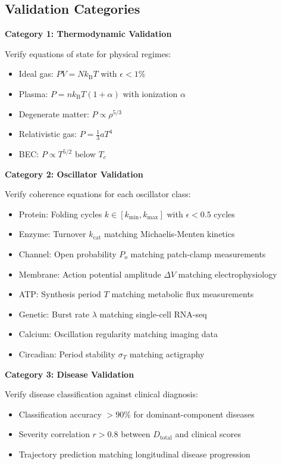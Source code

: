 \documentclass[10pt,twocolumn]{article}
\theoremstyle{plain}
\theoremstyle{definition}
\theoremstyle{remark}
\newcommand{\kB}{k_{\mathrm{B}}}
\begin{document}
\subsection{Validation Categories}

\textbf{Category 1: Thermodynamic Validation}

Verify equations of state for physical regimes:
\begin{itemize}
\item Ideal gas: $PV = N\kB T$ with $\epsilon < 1\%$
\item Plasma: $P = n\kB T(1 + \alpha)$ with ionization $\alpha$
\item Degenerate matter: $P \propto \rho^{5/3}$
\item Relativistic gas: $P = \frac{1}{3}aT^4$
\item BEC: $P \propto T^{5/2}$ below $T_c$
\end{itemize}

\textbf{Category 2: Oscillator Validation}

Verify coherence equations for each oscillator class:
\begin{itemize}
\item Protein: Folding cycles $k \in [k_{\min}, k_{\max}]$ with $\epsilon < 0.5$ cycles
\item Enzyme: Turnover $k_{\mathrm{cat}}$ matching Michaelis-Menten kinetics
\item Channel: Open probability $P_o$ matching patch-clamp measurements
\item Membrane: Action potential amplitude $\Delta V$ matching electrophysiology
\item ATP: Synthesis period $T$ matching metabolic flux measurements
\item Genetic: Burst rate $\lambda$ matching single-cell RNA-seq
\item Calcium: Oscillation regularity matching imaging data
\item Circadian: Period stability $\sigma_T$ matching actigraphy
\end{itemize}

\textbf{Category 3: Disease Validation}

Verify disease classification against clinical diagnosis:
\begin{itemize}
\item Classification accuracy $> 90\%$ for dominant-component diseases
\item Severity correlation $r > 0.8$ between $D_{\mathrm{total}}$ and clinical scores
\item Trajectory prediction matching longitudinal disease progression
\end{itemize}
\end{document}
